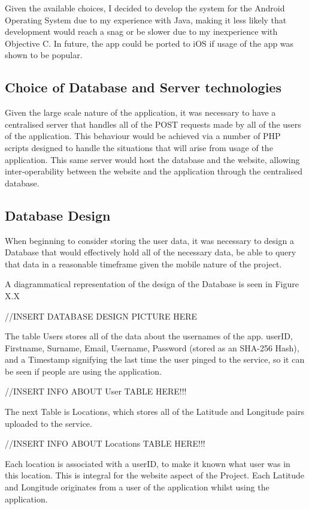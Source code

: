 \documentclass{l4proj}
\begin{document}
Given the available choices, I decided to develop the system for the Android Operating System due to my experience with Java, making it less likely that development would reach a snag or be slower due to my inexperience with Objective C. In future, the app could be ported to iOS if usage of the app was shown to be popular.

\subsection{Choice of Database and Server technologies}

Given the large scale nature of the application, it was necessary to have a centralised server that handles all of the POST requests made by all of the users of the application. This behaviour would be achieved via a number of PHP scripts designed to handle the situations that will arise from usage of the application. This same server would host the database and the website, allowing inter-operability between the website and the application through the centralised database.

\subsection{Database Design}

When beginning to consider storing the user data, it was necessary to design a Database that would effectively hold all of the necessary data, be able to query that data in a reasonable timeframe given the mobile nature of the project.

A diagrammatical representation of the design of the Database is seen in Figure X.X

//INSERT DATABASE DESIGN PICTURE HERE

The table Users stores all of the data about the usernames of the app. userID, Firstname, Surname, Email, Username, Password (stored as an SHA-256 Hash), and a Timestamp signifying the last time the user pinged to the service, so it can be seen if people are using the application.

//INSERT INFO ABOUT User TABLE HERE!!!

The next Table is Locations, which stores all of the Latitude and Longitude pairs uploaded to the service.

//INSERT INFO ABOUT Locations TABLE HERE!!!

Each location is associated with a userID, to make it known what user was in this location. This is integral for the website aspect of the Project. Each Latitude and Longitude originates from a user of the application whilst using the application.
\end{document}
